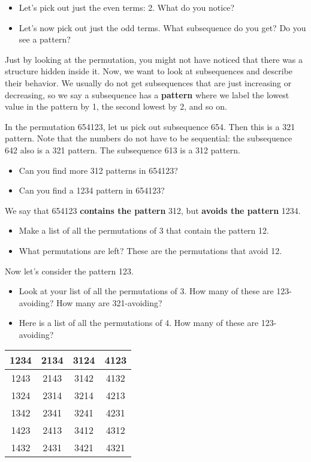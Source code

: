 \begin{itemize}
\item Let’s pick out just the even terms: 2\;\;\;. What do you notice?
\item Let’s now pick out just the odd terms. What subsequence do you get? Do you see a pattern?
\end{itemize}


Just by looking at the permutation, you might not have noticed that there was a structure hidden inside it. Now, we want to look at subsequences and describe their behavior. We usually do not get subsequences that are just increasing or decreasing, so we say a subsequence has a \textbf{pattern} where we label the lowest value in the pattern by 1, the second lowest by 2, and so on.


\begin{ex}
In the permutation 654123, let us pick out subsequence 654. Then this is a 321 pattern. Note that the numbers do not have to be sequential: the subsequence 642 also is a 321 pattern. The subsequence 613 is a 312 pattern.
\end{ex}


\begin{itemize}
\item Can you find more 312 patterns in 654123?
\item Can you find a 1234 pattern in 654123?
\end{itemize}


We say that 654123 \textbf{contains the pattern} 312, but \textbf{avoids the pattern} 1234.


\begin{itemize}
\item Make a list of all the permutations of 3 that contain the pattern 12.
\item What permutations are left? These are the permutations that avoid 12.
\end{itemize}


Now let’s consider the pattern 123.


\begin{itemize}
\item Look at your list of all the permutations of 3. How many of these are 123-avoiding? How many are 321-avoiding?
\item Here is a list of all the permutations of 4. How many of these are 123-avoiding?
\end{itemize}


	\begin{table}[H]
	\centering
	\begin{tabular}{|c|c|c|c|} \hline
	1234 & 2134 & 3124 & 4123 \\ \hline
	1243 & 2143 & 3142 & 4132 \\ \hline
	1324 & 2314 & 3214 & 4213 \\ \hline
	1342 & 2341 &  3241 & 4231 \\ \hline
	1423 & 2413 &  3412 & 4312 \\ \hline
	1432 & 2431 & 3421 & 4321 \\ \hline
	\end{tabular}
	\end{table}


